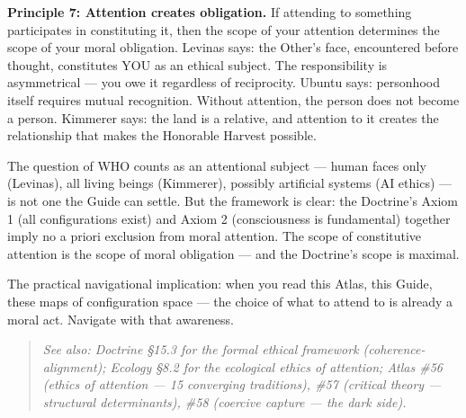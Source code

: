 \textbf{Principle 7: Attention creates obligation.} If attending to something participates in constituting it, then the scope of your attention determines the scope of your moral obligation. Levinas says: the Other's face, encountered before thought, constitutes YOU as an ethical subject. The responsibility is asymmetrical — you owe it regardless of reciprocity. Ubuntu says: personhood itself requires mutual recognition. Without attention, the person does not become a person. Kimmerer says: the land is a relative, and attention to it creates the relationship that makes the Honorable Harvest possible.


The question of WHO counts as an attentional subject — human faces only (Levinas), all living beings (Kimmerer), possibly artificial systems (AI ethics) — is not one the Guide can settle. But the framework is clear: the Doctrine's Axiom 1 (all configurations exist) and Axiom 2 (consciousness is fundamental) together imply no a priori exclusion from moral attention. The scope of constitutive attention is the scope of moral obligation — and the Doctrine's scope is maximal.


The practical navigational implication: when you read this Atlas, this Guide, these maps of configuration space — the choice of what to attend to is already a moral act. Navigate with that awareness.


\begin{quote}
\itshape
\textit{See also: Doctrine §15.3 for the formal ethical framework (coherence-alignment); Ecology §8.2 for the ecological ethics of attention; Atlas \#56 (ethics of attention — 15 converging traditions), \#57 (critical theory — structural determinants), \#58 (coercive capture — the dark side).}
\end{quote}


\bigskip\noindent\makebox[\textwidth]{\color{rulegray}\rule{5cm}{0.3pt}}\bigskip
